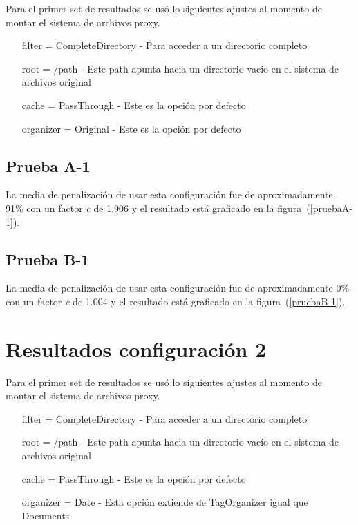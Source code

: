 Para el primer set de resultados se usó lo siguientes ajustes al momento de montar el sistema de archivos proxy.

\begin{itemize}
\item[filter] = CompleteDirectory - Para acceder a un directorio completo
\item[root] = /path - Este path apunta hacia un directorio vacío en el sistema de archivos original
\item[cache] = PassThrough - Este es la opción por defecto
\item[organizer] = Original - Este es la opción por defecto
\end{itemize}

\subsection{Prueba A-1}

La media de penalización de usar esta configuración fue de aproximadamente 91\% con un factor \textit{c} de 1.906 y el resultado está graficado en la figura~(\ref{pruebaA-1}).


\subsection{Prueba B-1}

La media de penalización de usar esta configuración fue de aproximadamente 0\% con un factor \textit{c} de 1.004 y el resultado está graficado en la figura~(\ref{pruebaB-1}).



\section{Resultados configuración 2}

Para el primer set de resultados se usó lo siguientes ajustes al momento de montar el sistema de archivos proxy.

\begin{itemize}
\item[filter] = CompleteDirectory - Para acceder a un directorio completo
\item[root] = /path - Este path apunta hacia un directorio vacío en el sistema de archivos original
\item[cache] = PassThrough - Este es la opción por defecto
\item[organizer] = Date - Esta opción extiende de TagOrganizer igual que Documents
\end{itemize}


